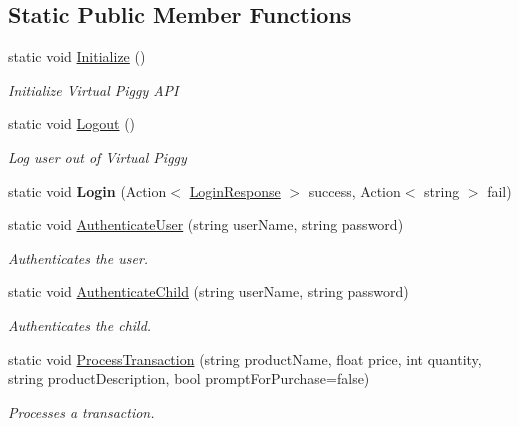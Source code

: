 \subsection*{Static Public Member Functions}
\begin{DoxyCompactItemize}
\item 
static void \hyperlink{class_virtual_piggy_a9d88b45c735cc1d66f5b1b040d6f06f2}{Initialize} ()
\begin{DoxyCompactList}\small\item\em Initialize Virtual Piggy A\-P\-I \end{DoxyCompactList}\item 
static void \hyperlink{class_virtual_piggy_ac6801551dbc6b114cf51c40b9f38703d}{Logout} ()
\begin{DoxyCompactList}\small\item\em Log user out of Virtual Piggy \end{DoxyCompactList}\item 
\hypertarget{class_virtual_piggy_a6848953790e21496550c6d6d0a34c4e4}{static void {\bfseries Login} (Action$<$ \hyperlink{class_virtual_piggy_1_1_login_response}{Login\-Response} $>$ success, Action$<$ string $>$ fail)}\label{class_virtual_piggy_a6848953790e21496550c6d6d0a34c4e4}

\item 
static void \hyperlink{class_virtual_piggy_a5af0f57e5b47349aa2130ff7930d2d17}{Authenticate\-User} (string user\-Name, string password)
\begin{DoxyCompactList}\small\item\em Authenticates the user. \end{DoxyCompactList}\item 
static void \hyperlink{class_virtual_piggy_a3db7e0e95d00378043520e4c83b17fd8}{Authenticate\-Child} (string user\-Name, string password)
\begin{DoxyCompactList}\small\item\em Authenticates the child. \end{DoxyCompactList}\item 
static void \hyperlink{class_virtual_piggy_ab40b96be4aaf8a8f20d97293b1bdda7d}{Process\-Transaction} (string product\-Name, float price, int quantity, string product\-Description, bool prompt\-For\-Purchase=false)
\begin{DoxyCompactList}\small\item\em Processes a transaction. \end{DoxyCompactList}\end{DoxyCompactItemize}
